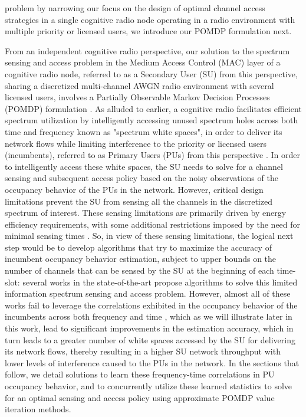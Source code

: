 problem by narrowing our focus on the design of optimal channel access strategies in a single cognitive radio node operating in a radio environment with multiple priority or licensed users, we introduce our POMDP formulation next.

From an independent cognitive radio perspective, our solution to the spectrum sensing and access problem in the Medium Access Control (MAC) layer of a cognitive radio node, referred to as a Secondary User (SU) from this perspective, sharing a discretized multi-channel AWGN radio environment with several licensed users, involves a Partially Observable Markov Decision Processes (POMDP) formulation \cite{WCL:paper}. As alluded to earlier, a cognitive radio facilitates efficient spectrum utilization by intelligently accessing unused spectrum holes across both time and frequency known as "spectrum white spaces", in order to deliver its network flows while limiting interference to the priority or licensed users (incumbents), referred to as Primary Users (PUs) from this perspective \cite{WCL:2}. In order to intelligently access these white spaces, the SU needs to solve for a channel sensing and subsequent access policy based on the noisy observations of the occupancy behavior of the PUs in the network. However, critical design limitations prevent the SU from sensing all the channels in the discretized spectrum of interest. These sensing limitations are primarily driven by energy efficiency requirements, with some additional restrictions imposed by the need for minimal sensing times \cite{WCL:3}. So, in view of these sensing limitations, the logical next step would be to develop algorithms that try to maximize the accuracy of incumbent occupancy behavior estimation, subject to upper bounds on the number of channels that can be sensed by the SU at the beginning of each time-slot: several works in the state-of-the-art \cite{WCL:4,WCL:5,WCL:6,WCL:7} propose algorithms to solve this limited information spectrum sensing and access problem. However, almost all of these works \cite{WCL:4,WCL:5,WCL:8,WCL:9,WCL:10,WCL:11} fail to leverage the correlations exhibited in the occupancy behavior of the incumbents across both frequency and time \cite{WCL:12}, which as we will illustrate later in this work, lead to significant improvements in the estimation accuracy, which in turn leads to a greater number of white spaces accessed by the SU for delivering its network flows, thereby resulting in a higher SU network throughput with lower levels of interference caused to the PUs in the network. In the sections that follow, we detail solutions to learn these frequency-time correlations in PU occupancy behavior, and to concurrently utilize these learned statistics to solve for an optimal sensing and access policy using approximate POMDP value iteration methods.

